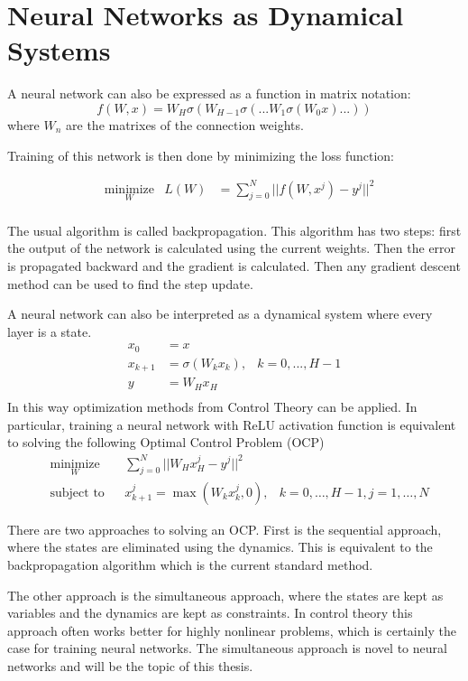 \documentclass[11pt]{article}
\begin{document}
\section{Neural Networks as Dynamical Systems}
A neural network can also be expressed as a function in matrix notation: 
\begin{equation*}
         f(W,x) = W_H\sigma(W_{H-1}\sigma(...W_1\sigma(W_0x)...))
\end{equation*}
where $W_n$ are the matrixes of the connection weights.

Training of this network is then done by minimizing the loss function:

\begin{equation*}
\begin{aligned}
& \underset{W}{\text{minimize}}
& L(W) &= \sum\limits_{j=0}^{N}||f(W,x^j) - y^j||^2 \\
\end{aligned}
\end{equation*}

The usual algorithm is called backpropagation. This algorithm has two steps: first the output of the network is calculated using the current weights. Then the error is propagated backward and the gradient is calculated. Then any gradient descent method can be used to find the step update.

A neural network can also be interpreted as a dynamical system where every layer is a state.
\begin{equation*}
	\begin{aligned}
	x_0 &= x \\
	x_{k+1} &= \sigma(W_kx_k), & k = 0,...,H-1 \\
	y &= W_Hx_H \\
	\end{aligned}
\end{equation*}
In this way optimization methods from Control Theory can be applied. In particular, training a neural network with ReLU activation function is equivalent to solving the following Optimal Control Problem (OCP)
\begin{equation*}
	\begin{aligned}
	& \underset{W}{\text{minimize}}
	& & \sum\limits_{j=0}^{N}||W_Hx_H^j - y^j||^2 \\
	& \text{subject to}
	& & x_{k+1}^j = \max(W_kx_k^j,0), &k = 0,\ldots,H-1,j = 1,\ldots,N
	\end{aligned}
\end{equation*}

There are two approaches to solving an OCP. First is the sequential approach, where the states are eliminated using the dynamics. This is equivalent to the backpropagation algorithm which is the current standard method.

The other approach is the simultaneous approach, where the states are kept as variables and the dynamics are kept as constraints. In control theory this approach often works better for highly nonlinear problems, which is certainly the case for training neural networks. The simultaneous approach is novel to neural networks and will be the topic of this thesis.
\end{document}
